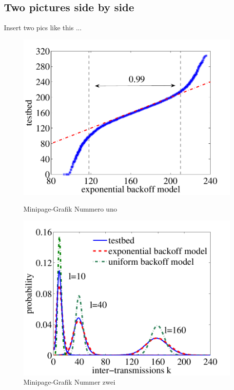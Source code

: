 \subsection{Two pictures side by side}
\label{sec:chapter03:grafiken:minipage}
Insert two pics like this ...

\begin{figure}[htbp]
  \centering
  \begin{minipage}[b]{5 cm}
    \includegraphics[width=\linewidth]{4.graphics/figures/qq-plot_gaus_vs_160} 
    \caption{Minipage-Grafik Nummero uno}
    \label{fig:chapter03:minipage:grafik1}
  \end{minipage}
  \begin{minipage}[b]{5 cm}
    \includegraphics[width=\linewidth]{4.graphics/figures/pdf_gaus_vs_uni_vs_10_40_160}  
    \caption{Minipage-Grafik Nummer zwei}
    \label{fig:chapter03:minipage:grafik2}
  \end{minipage}
\end{figure}




